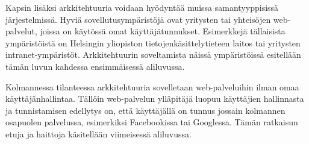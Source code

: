 Kapsin lisäksi arkkitehtuuria voidaan hyödyntää muissa samantyyppisissä järjestelmissä. Hyviä sovellutusympäristöjä ovat yritysten tai yhteisöjen web-palvelut, joissa on käytössä omat käyttäjätunnukset. Esimerkkejä tällaisista ympäristöistä on Helsingin yliopiston tietojenkäsittelytieteen laitos tai yritysten intranet-ympäristöt. Arkkitehtuurin soveltamista näissä ympäristöissä esitellään tämän luvun kahdessa ensimmäisessä aliluvussa.

Kolmannessa tilanteessa arkkitehtuuria sovelletaan web-palveluihin ilman omaa käyttäjänhallintaa. Tällöin web-palvelun ylläpitäjä luopuu käyttäjien hallinnasta ja tunnistamisen edellytys on, että käyttäjällä on tunnus jossain kolmannen osapuolen palvelussa, esimerkiksi Facebookissa tai Googlessa. Tämän ratkaisun etuja ja haittoja käsitellään viimeisessä aliluvussa.